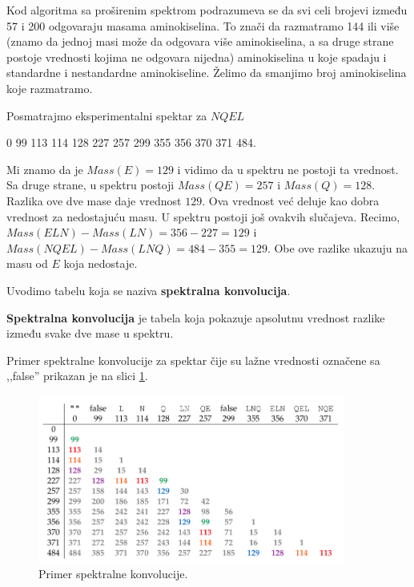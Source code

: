 Kod algoritma sa proširenim spektrom podrazumeva se da svi celi brojevi između 57 i 200 odgovaraju masama aminokiselina. To znači da razmatramo 144 ili više (znamo da jednoj masi može da odgovara više aminokiselina, a sa druge strane postoje vrednosti kojima ne odgovara nijedna) aminokiselina u koje spadaju i standardne i nestandardne aminokiseline. Želimo da smanjimo broj aminokiselina koje razmatramo. 

Posmatrajmo eksperimentalni spektar za $ NQEL $
\begin{center}
0 99 113 114 128 227 257 299 355 356 370 371 484.
\end{center}
\noindent Mi znamo da je $ Mass(E) = 129 $ i vidimo da u spektru ne postoji ta vrednost. Sa druge strane, u spektru postoji $ Mass(QE) = 257 $ i $ Mass(Q) = 128 $. Razlika ove dve mase daje vrednost $129$. Ova vrednost već deluje kao dobra vrednost za nedostajuću masu. U spektru postoji još ovakvih slučajeva. Recimo, $ Mass(ELN) - Mass(LN) = 356 - 227 = 129 $ i $ Mass(NQEL) - Mass(LNQ) = 484 - 355 = 129 $. Obe ove razlike ukazuju na masu od $E$ koja nedostaje.

Uvodimo tabelu koja se naziva \textbf{spektralna konvolucija}.
\begin{definicija}
\textbf{Spektralna konvolucija} je tabela koja pokazuje apsolutnu vrednost razlike između svake dve mase u spektru.
\end{definicija}

Primer spektralne konvolucije za spektar čije su lažne vrednosti označene sa ,,false'' prikazan je na slici \ref{slika:spektralnaKonvolucija}.

\begin{figure}[h!]
	\centering
	\includegraphics[width=0.9\textwidth]{poglavlja/4/slike/spektralnaKonvolucija.png}
	\caption{Primer spektralne konvolucije.}
	\label{slika:spektralnaKonvolucija}
\end{figure}

